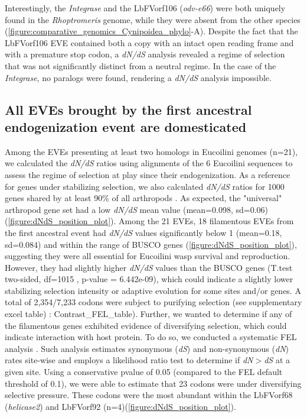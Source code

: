 Interestingly, the \textit{Integrase} and the LbFVorf106 (\textit{odv-e66}) were both uniquely found in the \textit{Rhoptromeris} genome, while they were absent from the other species (\figurename{\ref{figure:comparative_genomics_Cynipoidea_phylo}}-A). Despite the fact that the LbFVorf106 EVE contained both a copy with an intact open reading frame and with a premature stop codon, a \textit{dN/dS} analysis revealed a regime of selection that was not significantly distinct from a neutral regime. In the case of the \textit{Integrase}, no paralogs were found, rendering a \textit{dN/dS} analysis impossible. 

\subsection{All EVEs brought by the first ancestral endogenization event are domesticated}

Among the EVEs presenting at least two homologs in Eucoilini genomes (n=21), we calculated the \textit{dN/dS} ratios using alignments of the 6 Eucoilini sequences to assess the regime of selection at play since their endogenization. As a reference for genes under stabilizing selection, we also calculated \textit{dN/dS} ratios for 1000 genes shared by at least 90\% of all arthropods \citep{simao_busco_2015}. As expected, the "universal" arthropod gene set had a low \textit{dN/dS} mean value (mean=0.098, sd=0.06)(\figurename{\ref{figure:dNdS_position_plot}}). Among the 21 EVEs, 18 filamentous EVEs from the first ancestral event had \textit{dN/dS} values significantly below 1 (mean=0.18, sd=0.084) and within the range of BUSCO genes (\figurename{\ref{figure:dNdS_position_plot}}), suggesting they were all essential for Eucoilini wasp survival and reproduction. However, they had slightly higher \textit{dN/dS} values than the BUSCO genes (T.test two-sided, df=1015 , p-value = 6.442e-09), which could indicate a slightly lower stabilizing selection intensity or adaptive evolution for some sites and/or genes. A total of 2,354/7,233 codons were subject to purifying selection (see supplementary excel table) : Contrast\_FEL\_table). Further, we wanted to determine if any of the filamentous genes exhibited evidence of diversifying selection, which could indicate interaction with host protein. To do so, we conducted a systematic FEL analysis \citep{kosakovsky_pond_not_2005}. Such analysis estimates synonymous (\textit{dS}) and non-synonymous (\textit{dN}) rates site-wise and employs a likelihood ratio test to determine if \textit{dN$>$dS} at a given site. Using a conservative pvalue of 0.05 (compared to the FEL default threshold of 0.1), we were able to estimate that 23 codons were under diversifying selective pressure. These codons were the most abundant within the LbFVorf68 (\textit{helicase2}) and LbFVorf92 (n=4)(\figurename{\ref{figure:dNdS_position_plot}}).

